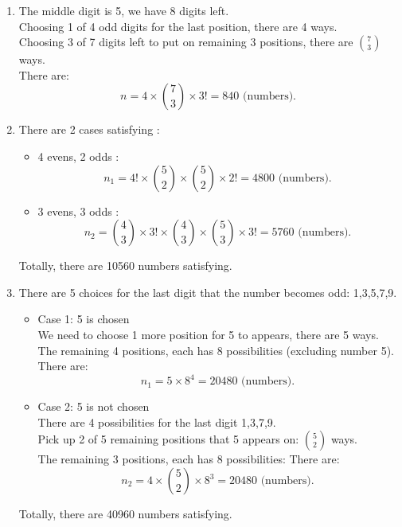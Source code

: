 \documentclass[a4paper]{article}
\begin{document}
\begin{enumerate}
	\item The middle digit is 5, we have 8 digits left.\\
	      Choosing 1 of 4 odd digits for the last position, there are 4 ways. \\
	      Choosing 3 of 7 digits left to put on remaining 3 positions, there are $7\choose3$ ways. \\
	      There are:
	      \begin{equation*}
		      n = 4 \times {7 \choose 3} \times 3! =  840  \text{ (numbers). }
	      \end{equation*}
	\item There are 2 cases satisfying :
	      \begin{itemize}
		      \item 4 evens, 2 odds :
		            \begin{equation*}
			            n_1 = 4! \times {5 \choose 2} \times {5 \choose 2} \times 2! = 4800 \text{ (numbers). }
		            \end{equation*}
		      \item 3 evens, 3 odds :
		            \begin{equation*}
			            n_2 = {4 \choose 3} \times 3! \times {4 \choose 3} \times {5 \choose 3} \times 3! = 5760 \text{ (numbers). }
		            \end{equation*}
		            
	      \end{itemize}
	      Totally, there are 10560 numbers satisfying.
	\item There are 5 choices for the last digit that the number becomes odd: 1,3,5,7,9.
	      \begin{itemize}
		      \item Case 1: 5 is chosen \\
		            We need to choose 1 more position for 5 to appears, there are 5 ways. The remaining 4 positions, each has 8 possibilities (excluding number 5). 
		            There are:
		            \begin{equation*}
			            n_1 = 5 \times  8^{4} = 20480 \text{ (numbers). }
		            \end{equation*}
		      \item Case 2: 5 is not chosen \\
		            There are 4 possibilities for the last digit 1,3,7,9. \\
		            Pick up 2 of 5 remaining positions that 5 appears on: $ 5\choose 2$ ways.\\
		            The remaining 3 positions, each has 8 possibilities:
		            There are:
		            \begin{equation*}
			            n_2 = 4 \times {5 \choose 2} \times 8^{3} = 20480 \text{ (numbers). }
		            \end{equation*}
	      \end{itemize}
	      Totally, there are 40960 numbers satisfying.
\end{enumerate}
\end{document}

